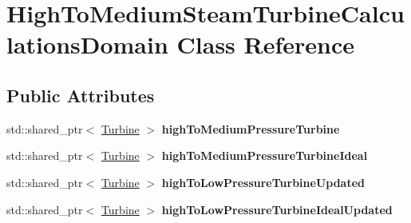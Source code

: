 \hypertarget{class_high_to_medium_steam_turbine_calculations_domain}{}\section{High\+To\+Medium\+Steam\+Turbine\+Calculations\+Domain Class Reference}
\label{class_high_to_medium_steam_turbine_calculations_domain}
\subsection*{Public Attributes}
\begin{DoxyCompactItemize}
\item 
\mbox{\label{class_high_to_medium_steam_turbine_calculations_domain_a9f9a152d1a4979ea41fdd30f6e427365}} 
std\+::shared\+\_\+ptr$<$ \hyperlink{class_turbine}{Turbine} $>$ {\bfseries high\+To\+Medium\+Pressure\+Turbine}
\item 
\mbox{\label{class_high_to_medium_steam_turbine_calculations_domain_a736c0ae7bf76dc74e84d99aacad73002}} 
std\+::shared\+\_\+ptr$<$ \hyperlink{class_turbine}{Turbine} $>$ {\bfseries high\+To\+Medium\+Pressure\+Turbine\+Ideal}
\item 
\mbox{\label{class_high_to_medium_steam_turbine_calculations_domain_a1a2552e10edee276dd9119c872c7ee37}} 
std\+::shared\+\_\+ptr$<$ \hyperlink{class_turbine}{Turbine} $>$ {\bfseries high\+To\+Low\+Pressure\+Turbine\+Updated}
\item 
\mbox{\label{class_high_to_medium_steam_turbine_calculations_domain_ad743549e29f7ff94e27e50cff8ac42e4}} 
std\+::shared\+\_\+ptr$<$ \hyperlink{class_turbine}{Turbine} $>$ {\bfseries high\+To\+Low\+Pressure\+Turbine\+Ideal\+Updated}
\end{DoxyCompactItemize}
